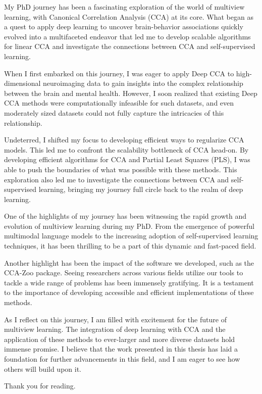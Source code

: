 My PhD journey has been a fascinating exploration of the world of multiview learning, with Canonical Correlation Analysis (CCA) at its core. What began as a quest to apply deep learning to uncover brain-behavior associations quickly evolved into a multifaceted endeavor that led me to develop scalable algorithms for linear CCA and investigate the connections between CCA and self-supervised learning.

When I first embarked on this journey, I was eager to apply Deep CCA to high-dimensional neuroimaging data to gain insights into the complex relationship between the brain and mental health. However, I soon realized that existing Deep CCA methods were computationally infeasible for such datasets, and even moderately sized datasets could not fully capture the intricacies of this relationship.

Undeterred, I shifted my focus to developing efficient ways to regularize CCA models. This led me to confront the scalability bottleneck of CCA head-on. By developing efficient algorithms for CCA and Partial Least Squares (PLS), I was able to push the boundaries of what was possible with these methods. This exploration also led me to investigate the connections between CCA and self-supervised learning, bringing my journey full circle back to the realm of deep learning.

One of the highlights of my journey has been witnessing the rapid growth and evolution of multiview learning during my PhD. From the emergence of powerful multimodal language models to the increasing adoption of self-supervised learning techniques, it has been thrilling to be a part of this dynamic and fast-paced field.

Another highlight has been the impact of the software we developed, such as the CCA-Zoo package. Seeing researchers across various fields utilize our tools to tackle a wide range of problems has been immensely gratifying. It is a testament to the importance of developing accessible and efficient implementations of these methods.

As I reflect on this journey, I am filled with excitement for the future of multiview learning. The integration of deep learning with CCA and the application of these methods to ever-larger and more diverse datasets hold immense promise. I believe that the work presented in this thesis has laid a foundation for further advancements in this field, and I am eager to see how others will build upon it.

Thank you for reading.